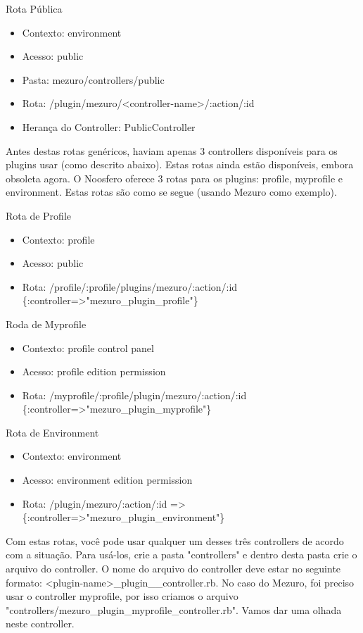 \documentclass[11pt]{article}
\begin{document}
Rota Pública
\begin{itemize}
  \item Contexto: environment
  \item Acesso: public
  \item Pasta: mezuro/controllers/public
  \item Rota: /plugin/mezuro/<controller-name>/:action/:id
  \item Herança do Controller: PublicController
\end{itemize}

Antes destas rotas genéricos, haviam apenas 3 controllers disponíveis para os
plugins usar (como descrito abaixo). Estas rotas ainda estão disponíveis,
embora obsoleta agora. O Noosfero oferece 3 rotas para os plugins: profile,
myprofile e environment. Estas rotas são como se segue (usando Mezuro como
exemplo).

Rota de Profile
\begin{itemize}
  \item Contexto: profile
  \item Acesso: public
  \item Rota: /profile/:profile/plugins/mezuro/:action/:id
    \{:controller=>"mezuro\_plugin\_profile"\}
\end{itemize}

Roda de Myprofile
\begin{itemize}
  \item Contexto: profile control panel
  \item Acesso: profile edition permission
  \item Rota: /myprofile/:profile/plugin/mezuro/:action/:id
    \{:controller=>"mezuro\_plugin\_myprofile"\}
\end{itemize}

Rota de Environment
\begin{itemize}
  \item Contexto: environment
  \item Acesso: environment edition permission
  \item Rota: /plugin/mezuro/:action/:id =>
    \{:controller=>"mezuro\_plugin\_environment"\}
\end{itemize}

Com estas rotas, você pode usar qualquer um desses três controllers de acordo
com a situação. Para usá-los, crie a pasta "controllers" e dentro desta pasta
crie o arquivo do controller. O nome do arquivo do controller deve estar no
seguinte formato: <plugin-name>\_plugin\_<desired-controller>\_controller.rb. No
caso do Mezuro, foi preciso usar o controller myprofile, por isso criamos o
arquivo "controllers/mezuro\_plugin\_myprofile\_controller.rb". Vamos dar uma
olhada neste controller.
\end{document}
